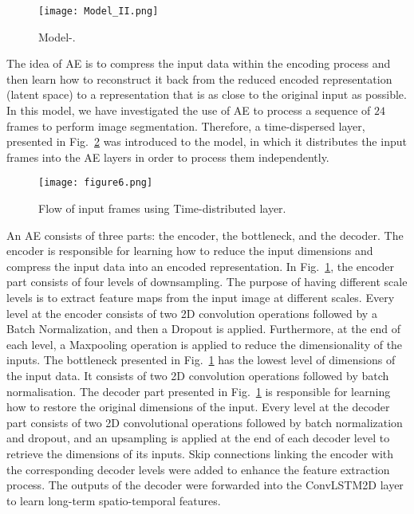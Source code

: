 \begin{sloppypar}
	\begin{figure} [ht!]
			\centering
			\texttt{[image: Model\_II.png]}
			\caption{Model-.} %
			\label{fig:AE_convlstm}
	\end{figure} 
	
	The idea of AE is to compress the input data within the encoding process and then learn how to reconstruct it back from the reduced encoded representation (latent space) to a representation that is as close to the original input as possible. 
	In this model, we have investigated the use of AE to process a sequence of \(24\) frames to perform image segmentation.
	Therefore, a time-dispersed layer, presented in Fig.~\ref{fig:TD} was introduced to the model, in which it distributes the input frames into the AE layers in order to process them independently.
	\begin{figure}[!ht]
		\centering
		\texttt{[image: figure6.png]}
		\caption{Flow of input frames using Time-distributed layer.}
		\label{fig:TD}
	\end{figure}
	
	An AE consists of three parts: the encoder, the bottleneck, and the decoder.
	The encoder is responsible for learning how to reduce the input dimensions and compress the input data into an encoded representation.
	In Fig.~\ref{fig:AE_convlstm}, the encoder part consists of four levels of downsampling. 
	The purpose of having different scale levels is to extract feature maps from the input image at different scales.
	Every level at the encoder consists of two 2D convolution operations followed by a Batch Normalization, and then a Dropout is applied.
	Furthermore, at the end of each level, a Maxpooling operation is applied to reduce the dimensionality of the inputs. 
	The bottleneck presented in Fig.~\ref{fig:AE_convlstm} has the lowest level of dimensions of the input data.
	It consists of two 2D convolution operations followed by batch normalisation.
	The decoder part presented in Fig.~\ref{fig:AE_convlstm} is responsible for learning how to restore the original dimensions of the input.
	Every level at the decoder part consists of two 2D convolutional operations followed by batch normalization and dropout, and an upsampling is applied at the end of each decoder level to retrieve the dimensions of its inputs.
	Skip connections linking the encoder with the corresponding decoder levels were added to enhance the feature extraction process.
	The outputs of the decoder were forwarded into the ConvLSTM2D layer to learn long-term spatio-temporal features.
	

\end{sloppypar}
